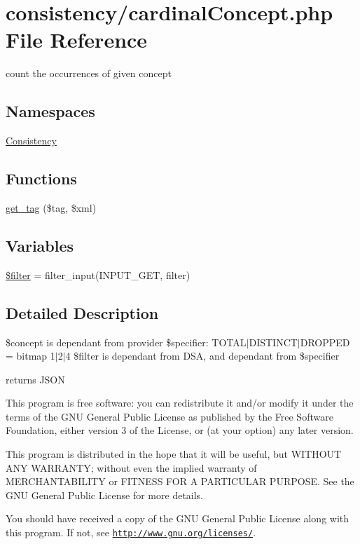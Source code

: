 \hypertarget{cardinal_concept_8php}{}\section{consistency/cardinal\+Concept.php File Reference}
\label{cardinal_concept_8php}


count the occurrences of given concept  


\subsection*{Namespaces}
\begin{DoxyCompactItemize}
\item 
 \hyperlink{namespace_consistency}{Consistency}
\end{DoxyCompactItemize}
\subsection*{Functions}
\begin{DoxyCompactItemize}
\item 
\hyperlink{namespace_consistency_ab1a6caf75ca08c5daec473d54c0416da}{get\+\_\+tag} (\$tag, \$xml)
\end{DoxyCompactItemize}
\subsection*{Variables}
\begin{DoxyCompactItemize}
\item 
\hyperlink{namespace_consistency_aac53bdb48bdd96ff9c20e2a86f48ce5f}{\$filter} = filter\+\_\+input(I\+N\+P\+U\+T\+\_\+\+G\+ET, \textquotesingle{}filter\textquotesingle{})
\end{DoxyCompactItemize}


\subsection{Detailed Description}
\$concept is dependant from provider \$specifier\+: T\+O\+T\+A\+L$\vert$\+D\+I\+S\+T\+I\+N\+C\+T$\vert$\+D\+R\+O\+P\+P\+ED = bitmap 1$\vert$2$\vert$4 \$filter is dependant from D\+SA, and dependant from \$specifier

returns J\+S\+ON

This program is free software\+: you can redistribute it and/or modify it under the terms of the G\+NU General Public License as published by the Free Software Foundation, either version 3 of the License, or (at your option) any later version.

This program is distributed in the hope that it will be useful, but W\+I\+T\+H\+O\+UT A\+NY W\+A\+R\+R\+A\+N\+TY; without even the implied warranty of M\+E\+R\+C\+H\+A\+N\+T\+A\+B\+I\+L\+I\+TY or F\+I\+T\+N\+E\+SS F\+OR A P\+A\+R\+T\+I\+C\+U\+L\+AR P\+U\+R\+P\+O\+SE. See the G\+NU General Public License for more details.

You should have received a copy of the G\+NU General Public License along with this program. If not, see \href{http://www.gnu.org/licenses/}{\tt http\+://www.\+gnu.\+org/licenses/}. 